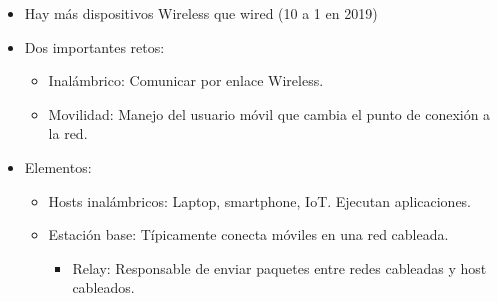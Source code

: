 \documentclass[12pt, twoside, openright]{report} %
\begin{document}
      \begin{itemize}
      \item
        Hay más dispositivos Wireless que wired (10 a 1 en 2019)
      \item
        Dos importantes retos:

        \begin{itemize}
        \item
          Inalámbrico: Comunicar por enlace Wireless.
        \item
          Movilidad: Manejo del usuario móvil que cambia el punto de
          conexión a la red.
        \end{itemize}
        \pagebreak
      \item
        Elementos:

        \begin{itemize}
        \item
          Hosts inalámbricos: Laptop, smartphone, IoT. Ejecutan
          aplicaciones.
        \item
          Estación base: Típicamente conecta móviles en una red
          cableada.
          \begin{itemize}
      \item
        Relay: Responsable de enviar paquetes entre redes cableadas y
        host cableados.
      \end{itemize}
   

\end{itemize}
\end{itemize}
\end{document}
